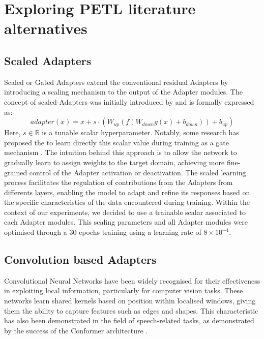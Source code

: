 \section{Exploring PETL literature alternatives}
\subsection{Scaled Adapters}
Scaled or Gated Adapters extend the conventional residual Adapters by introducing a scaling mechanism to the output of the Adapter modules. The concept of scaled-Adapters was initially introduced by \cite{he2022towards} and is formally expressed as:
\begin{equation}
    adapter(x) = x + s \cdot (W_{up}(f(W_{down}g(x) + b_{down})) + b_{up})    
\end{equation}
Here, $s \in \mathbb{R}$ is a tunable scalar hyperparameter. Notably, some research has proposed the to learn directly this scalar value during training as a gate mechanism \cite{mao-etal-2022-unipelt}. The intuition behind this approach is to allow the network to gradually learn to assign weights to the target domain, achieving more fine-grained control of the Adapter activation or deactivation. The scaled learning process facilitates the regulation of contributions from the Adapters from differents layers, enabling the model to adapt and refine its responses based on the specific characteristics of the data encountered during training.
Within the context of our experiments, we decided to use a trainable scalar associated to each Adapter modules. This scaling parameters and all Adapter modules were optimised through a 30 epochs training using a learning rate of $8 \times 10^{-4}$.

\subsection{Convolution based Adapters}
Convolutional Neural Networks have been widely recognised for their effectiveness in exploiting local information, particularly for computer vision tasks. These networks learn shared kernels based on position within localised windows, giving them the ability to capture features such as edges and shapes. This characteristic has also been demonstrated in the field of speech-related tasks, as demonstrated by the success of the Conformer architecture \cite{gulati2020conformer}.

